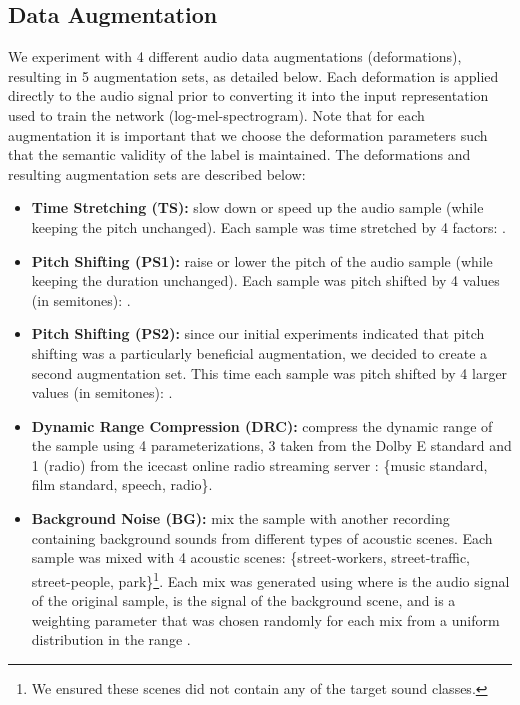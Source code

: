 \documentclass[journal,pdf]{IEEEtran}
\begin{document}
\subsection{Data Augmentation}
\label{sec:method:augmentation}

We experiment with 4 different audio data augmentations (deformations), resulting in 5 augmentation sets, as detailed below. Each deformation is applied directly to the audio signal prior to converting it into the input representation used to train  the network (log-mel-spectrogram). Note that for each augmentation it is important that we choose the deformation parameters such that the semantic validity of the label is maintained. The deformations and resulting augmentation sets are described below:
\begin{itemize}
\item \textbf{Time Stretching (TS):} slow down or speed up the audio sample (while keeping the pitch unchanged). Each sample was time stretched by 4 factors: .
\item \textbf{Pitch Shifting (PS1):} raise or lower the pitch of the audio sample (while keeping the duration unchanged). Each sample was pitch shifted by 4 values (in semitones): .
\item \textbf{Pitch Shifting (PS2):} since our initial experiments indicated that pitch shifting was a particularly beneficial augmentation, we decided to create a second augmentation set. This time each sample was pitch shifted by 4 larger values (in semitones): .
\item \textbf{Dynamic Range Compression (DRC):} compress the dynamic range of the sample using 4 parameterizations, 3 taken from the Dolby E standard \cite{Dolby:DolbyEstandard:MISC:02} and 1 (radio) from the icecast online radio streaming server \cite{Icecast:MudaDRCSettings:MISC:16}: \{music standard, film standard, speech, radio\}.
\item \textbf{Background Noise (BG):} mix the sample with another recording containing background sounds from different types of acoustic scenes. Each sample was mixed with 4 acoustic scenes: \{street-workers, street-traffic, street-people, park\}\footnote{We ensured these scenes did not contain any of the target sound classes.}. Each mix  was generated using  where  is the audio signal of the original sample,  is the signal of the background scene, and  is a weighting parameter that was chosen randomly for each mix from a uniform distribution in the range .
\end{itemize}
\end{document}
